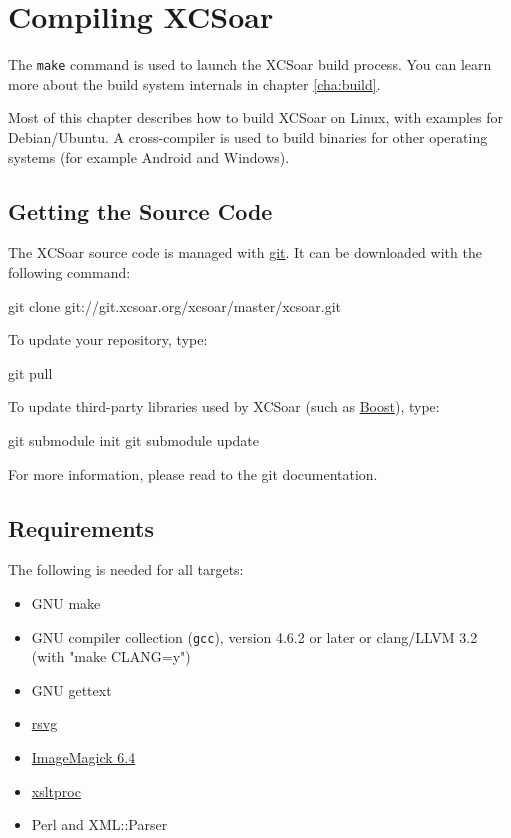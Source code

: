 \chapter{Compiling XCSoar}\label{cha:compiling}

The \texttt{make} command is used to launch the XCSoar build process.
You can learn more about the build system internals in chapter
\ref{cha:build}.

Most of this chapter describes how to build XCSoar on Linux, with
examples for Debian/Ubuntu.  A cross-compiler is used to build
binaries for other operating systems (for example Android and
Windows).

\section{Getting the Source Code}

The XCSoar source code is managed with
\href{http://git-scm.com/}{git}.  It can be downloaded with the
following command:

\begin{verbatim*}
git clone git://git.xcsoar.org/xcsoar/master/xcsoar.git
\end{verbatim*}

To update your repository, type:

\begin{verbatim*}
git pull
\end{verbatim*}

To update third-party libraries used by XCSoar (such as
\href{http://www.boost.org/}{Boost}), type:

\begin{verbatim*}
git submodule init
git submodule update
\end{verbatim*}

For more information, please read to the git documentation.

\section{Requirements}

The following is needed for all targets:

\begin{itemize}
\item GNU make
\item GNU compiler collection (\texttt{gcc}), version 4.6.2 or later
  or clang/LLVM 3.2 (with "make CLANG=y")
\item GNU gettext
\item \href{http://librsvg.sourceforge.net/)}{rsvg}
\item \href{http://www.imagemagick.org/}{ImageMagick 6.4}
\item \href{http://xmlsoft.org/XSLT/xsltproc2.html}{xsltproc}
\item Perl and XML::Parser
\end{itemize}


